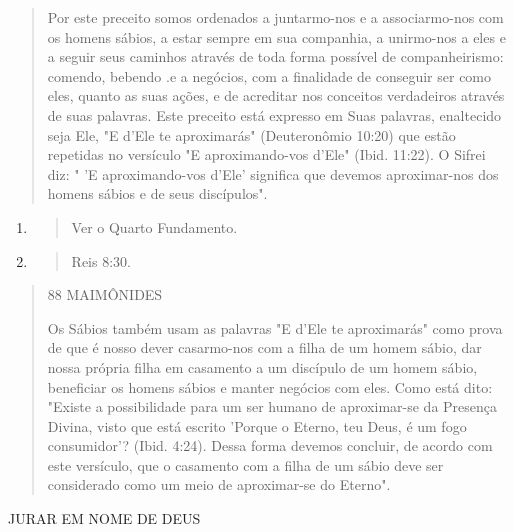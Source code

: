 \begin{quote}
Por este preceito somos ordenados a juntarmo-nos e a associarmo-nos com
os homens sábios, a estar sempre em sua companhia, a unirmo-nos a eles e
a seguir seus caminhos através de toda forma possível de
companheiris­mo: comendo, bebendo .e a negócios, com a finalidade de
conseguir ser como eles, quanto as suas ações, e de acreditar nos
conceitos verdadeiros através de suas palavras. Este preceito está
expresso em Suas palavras, enaltecido seja Ele, "E d'Ele te aproximarás"
(Deuteronômio 10:20) que estão repetidas no versí­culo "E
aproximando-vos d'Ele" (Ibid. 11:22). O Sifrei diz: " 'E aproximando-vos
d'Ele' significa que devemos aproximar-nos dos homens sábios e de seus
discípulos".
\end{quote}

\begin{enumerate}
\def\labelenumi{\arabic{enumi}.}
\setcounter{enumi}{28}
\item
  \begin{quote}
  Ver o Quarto Fundamento.
  \end{quote}
\item
  \begin{quote}
  Reis 8:30.
  \end{quote}
\end{enumerate}

\begin{quote}
88 MAIMÔNIDES

Os Sábios também usam as palavras "E d'Ele te aproximarás" como prova de
que é nosso dever casarmo-nos com a filha de um homem sábio, dar nossa
própria filha em casamento a um discípulo de um homem sábio, benefi­ciar
os homens sábios e manter negócios com eles. Como está dito: "Existe a
possibilidade para um ser humano de aproximar-se da Presença Divina,
visto que está escrito 'Porque o Eterno, teu Deus, é um fogo
consumidor'? (Ibid. 4:24). Dessa forma devemos concluir, de acordo com
este versículo, que o casamen­to com a filha de um sábio deve ser
considerado como um meio de aproximar-se do Eterno".
\end{quote}

JURAR EM NOME DE DEUS

